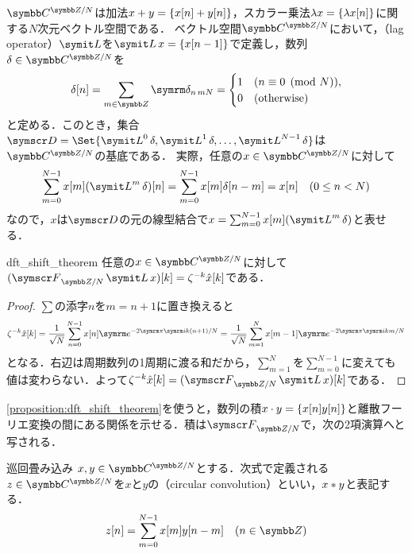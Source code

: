 \documentclass[../../main]{subfiles}
\begin{document}
\(\cycles{\numset{C}}{N}\)は加法\(x+y=\lbrace x[n]+y[n]\rbrace\)，スカラー乗法\(\lambda x=\lbrace\lambda x[n]\rbrace\)に関する\(N\)次元ベクトル空間である．
ベクトル空間\(\cycles{\numset{C}}{N}\)において，（lag operator）\(\lagop\)を\(\lagop x=\seq{x[n-1]}\)で定義し，数列\(\delta\in\cycles{\numset{C}}{N}\)を
\[
  \delta[n] = \sum_{m\in\numset{Z}}\kdelta{n}{mN}
  = \begin{cases}1 & (n\equiv 0\pmod{N}),\\ 0 & \text{(otherwise)}\end{cases}
\]
と定める．このとき，集合\(\basis{D}=\Set{\lagop^0\delta,\lagop^1\delta,\dots,\lagop^{N-1}\delta}\)は\(\cycles{\numset{C}}{N}\)の基底である．
実際，任意の\(x\in\cycles{\numset{C}}{N}\)に対して
\[
  \sum_{m=0}^{N-1}x[m](\lagop^m\delta)[n] = \sum_{m=0}^{N-1}x[m]\delta[n-m]
  = x[n]\quad(0\leq n<N)
\]
なので，\(x\)は\(\basis{D}\)の元の線型結合で\(x=\sum_{m=0}^{N-1}x[m](\lagop^m\delta)\)と表せる．

\begin{proposition}{}{dft_shift_theorem}
  任意の\(x\in\cycles{\numset{C}}{N}\)に対して\((\dft{N}\lagop x)[k]=\zeta^{-k}\hat{x}[k]\)である．
\end{proposition}

\begin{proof}
  \(\sum\)の添字\(n\)を\(m=n+1\)に置き換えると
  \[
    \zeta^{-k}\hat{x}[k] = \frac{1}{\sqrt{N}}\sum_{n=0}^{N-1}x[n]\napr^{-2\krez\iuni k(n+1)/N}
    = \frac{1}{\sqrt{N}}\sum_{m=1}^Nx[m-1]\napr^{-2\krez\iuni km/N}
  \]
  となる．右辺は周期数列の1周期に渡る和だから，\(\sum_{m=1}^N\)を\(\sum_{m=0}^{N-1}\)に変えても値は変わらない．よって\(\zeta^{-k}\hat{x}[k]=(\dft{N}\lagop x)[k]\)である．
\end{proof}

\cref{proposition:dft_shift_theorem}を使うと，数列の積\(x\cdot y=\lbrace x[n]y[n]\rbrace\)と離散フーリエ変換の間にある関係を示せる．積は\(\dft{N}\)で，次の2項演算へと写される．

\begin{definition}{巡回畳み込み}{}
  \(x,y\in\cycles{\numset{C}}{N}\)とする．次式で定義される\(z\in\cycles{\numset{C}}{N}\)を\(x\)と\(y\)の（circular convolution）といい，\(x\ast y\)と表記する．
  \[
    z[n] = \sum_{m=0}^{N-1}x[m]y[n-m]\quad(n\in\numset{Z})
  \]
\end{definition}
\end{document}
